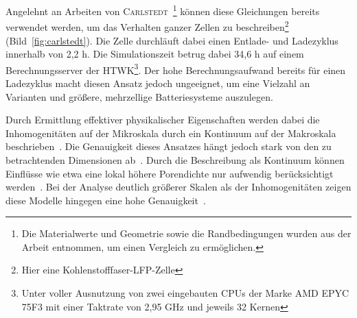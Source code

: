 Angelehnt an Arbeiten von \textsc{Carlstedt}~\cite{Carlstedt2022b}\footnote{Die Materialwerte und Geometrie sowie die Randbedingungen wurden aus der Arbeit entnommen, um einen Vergleich zu ermöglichen.} können diese Gleichungen bereits verwendet werden, um das Verhalten ganzer Zellen zu beschreiben\footnote{Hier eine Kohlenstofffaser-LFP-Zelle} (Bild~\ref{fig:carlstedt}). Die Zelle durchläuft dabei einen Entlade- und Ladezyklus innerhalb von 2,2 h. Die Simulationszeit betrug dabei 34,6 h auf einem Berechnungsserver der HTWK\footnote{Unter voller Ausnutzung von zwei eingebauten CPUs der Marke AMD EPYC 75F3 mit einer Taktrate von 2,95 GHz und jeweils 32 Kernen}. Der hohe Berechnungsaufwand bereits für einen Ladezyklus macht diesen Ansatz jedoch ungeeignet, um eine Vielzahl an Varianten und größere, mehrzellige Batteriesysteme auszulegen.

Durch Ermittlung effektiver physikalischer Eigenschaften werden dabei die Inhomogenitäten auf der Mikroskala durch ein Kontinuum auf der Makroskala beschrieben~\cite{Plett2024}. Die Genauigkeit dieses Ansatzes hängt jedoch stark von den zu betrachtenden Dimensionen ab~\cite{Plett2015}. Durch die Beschreibung als Kontinuum können Einflüsse wie etwa eine lokal höhere Porendichte nur aufwendig berücksichtigt werden~\cite{Mei2019}. Bei der Analyse deutlich größerer Skalen als der Inhomogenitäten zeigen diese Modelle hingegen eine hohe Genauigkeit~\cite{Plett2015}. 

